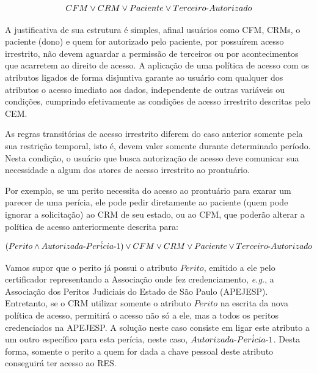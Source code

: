 \documentclass[a4paper,11pt]{article}
\begin{document}
\[ CFM \vee CRM \vee Paciente \vee Terceiro\textnormal{-}Autorizado \]

A justificativa de sua estrutura é simples, afinal usuários como CFM, CRMs, o paciente (dono) e quem for autorizado pelo paciente, por possuírem acesso irrestrito, não devem aguardar a permissão de terceiros ou por acontecimentos que acarretem ao direito de acesso.
A aplicação de uma política de acesso com os atributos ligados de forma disjuntiva garante ao usuário com qualquer dos atributos o acesso imediato aos dados, independente de outras variáveis ou condições, cumprindo efetivamente as condições de acesso irrestrito descritas pelo CEM.

As regras transitórias de acesso irrestrito diferem do caso anterior somente pela sua restrição temporal, isto é, devem valer somente durante determinado período.
Nesta condição, o usuário que busca autorização de acesso deve comunicar sua necessidade a algum dos atores de acesso irrestrito ao prontuário.

Por exemplo, se um perito necessita do acesso ao prontuário para exarar um parecer de uma perícia, ele pode pedir diretamente ao paciente (quem pode ignorar a solicitação) ao CRM de seu estado, ou ao CFM, que poderão alterar a política de acesso anteriormente descrita para:

\[ (Perito \wedge Autorizada\textnormal{-}Per\acute{i}cia\textnormal{-}1) \vee CFM \vee CRM \vee Paciente \vee Terceiro\textnormal{-}Autorizado \]

Vamos supor que o perito já possui o atributo $Perito$, emitido a ele pelo certificador representando a Associação onde fez credenciamento, \emph{e.g.}, a Associação dos Peritos Judiciais do Estado de São Paulo (APEJESP).
Entretanto, se o CRM utilizar somente o atributo $Perito$ na escrita da nova política de acesso, permitirá o acesso não só a ele, mas a todos os peritos credenciados na APEJESP.
A solução neste caso consiste em ligar este atributo a um outro específico para esta perícia, neste caso, $Autorizada\textnormal{-}Per\acute{i}cia\textnormal{-}1$.
Desta forma, somente o perito a quem for dada a chave pessoal deste atributo conseguirá ter acesso ao RES.
\end{document}
